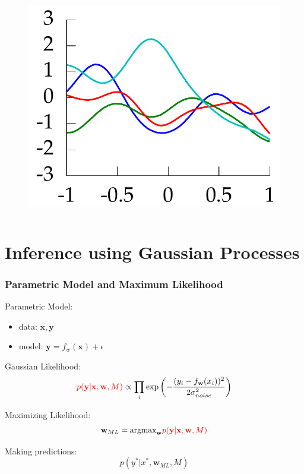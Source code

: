 \documentclass[10pt]{beamer}
\newcommand{\bx}{\mathbf{x}}
\newcommand{\by}{\mathbf{y}}
\newcommand{\bw}{\mathbf{w}}
\newcommand{\argmax}{\text{argmax}}
\begin{document}
\begin{frame}
\begin{columns}
      \begin{column}{0.45\textwidth}
        \begin{figure}
          \centering
          \includegraphics[width=\textwidth]{samplePaths.png}
        \end{figure}
      \end{column}
    \end{columns}
  \end{frame}

  \section{Inference using Gaussian Processes}

  \begin{frame}
    \frametitle{Parametric Model and Maximum Likelihood}
    Parametric Model:
      \begin{itemize}
        \item data: $\bx, \by$
        \item model: $\by = f_w(\bx) + \epsilon$
      \end{itemize}

    Gaussian Likelihood:
      \begin{equation*}
        \textcolor{red}{p(\by|\bx, \bw, M)} \propto \prod_i \exp \left( - \frac{ (y_i - f_{\bw}(x_i))^2}{2 \sigma_{noise}^2} \right)
      \end{equation*}

    Maximizing Likelihood:
      \begin{equation*}
        \bw_{ML} = \argmax_{\bw} \textcolor{red}{p(\by|\bx,\bw,M)}
      \end{equation*}

    Making predictions:
      \begin{equation*}
        p(y^*|x^*,\bw_{ML},M)
      \end{equation*}
  \end{frame}
\end{document}
